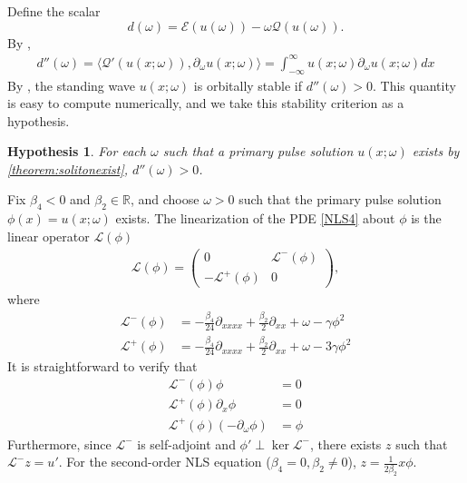 \documentclass[12pt]{article}
\def\R{{\mathbb R}}
\def\calE{{\mathcal E}}
\def\calQ{{\mathcal Q}}
\def\calL{{\mathcal L}}
\newtheorem{hypothesis}{Hypothesis}
\begin{document}
Define the scalar
\begin{equation}
d(\omega) = \calE(u(\omega)) - \omega\calQ(u(\omega)).
\end{equation}
By \cite[(2.21)]{Grillakis1987},
\begin{align}\label{ddoubleprime}
d''(\omega) = \langle \calQ'(u(x; \omega)), \partial_\omega u(x; \omega) \rangle
= \int_{-\infty}^\infty u(x; \omega) \partial_\omega u(x; \omega) dx
\end{align}
By \cite[Theorem 3.5]{Grillakis1987}, the standing wave $u(x; \omega)$ is orbitally stable if $d''(\omega) > 0$. This quantity is easy to compute numerically, and we take this stability criterion as a hypothesis.

\begin{hypothesis}\label{hyp:dccpos}
For each $\omega$ such that a primary pulse solution $u(x; \omega)$ exists by \cref{theorem:solitonexist}, $d''(\omega) > 0$.
\end{hypothesis}

Fix $\beta_4 < 0$ and $\beta_2 \in \R$, and choose $\omega > 0$ such that the primary pulse solution $\phi(x) = u(x; \omega)$ exists. The linearization of the PDE \cref{NLS4} about $\phi$ is the linear operator $\calL(\phi)$
\begin{align}\label{defLphi}
\calL(\phi) = 
\begin{pmatrix}
0 & \calL^-(\phi) \\
-\calL^+(\phi) & 0
\end{pmatrix},
\end{align}
where
\begin{align*}
\calL^-(\phi) &= -\frac{\beta_4}{24} \partial_{xxxx} + \frac{\beta_2}{2} \partial_{xx} + \omega - \gamma \phi^2 \\
\calL^+(\phi) &= -\frac{\beta_4}{24} \partial_{xxxx} + \frac{\beta_2}{2} \partial_{xx} + \omega - 3 \gamma \phi^2
\end{align*}
It is straightforward to verify that 
\begin{align*}
\calL^-(\phi) \phi &= 0 \\
\calL^+(\phi) \partial_x \phi &= 0 \\
\calL^+(\phi)(-\partial_\omega \phi) &= \phi
\end{align*}
Furthermore, since $\calL^-$ is self-adjoint and $\phi' \perp \ker \calL^-$, there exists $z$ such that $\calL^- z = u'$. For the second-order NLS equation ($\beta_4 = 0, \beta_2 \neq 0$), $z = \frac{1}{2 \beta_2} x \phi$. 
\end{document}
